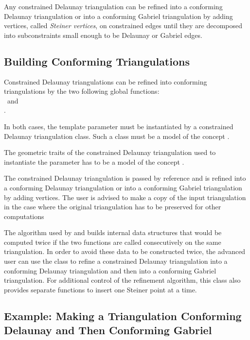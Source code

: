 Any constrained Delaunay triangulation can be refined into a
conforming Delaunay triangulation or into a conforming Gabriel
triangulation by adding vertices, called \emph{Steiner vertices}, on
constrained edges until they are decomposed into subconstraints small enough
to be Delaunay or Gabriel edges.

\subsection{Building Conforming Triangulations\label{sec:Mesh_2_building_conforming}}

Constrained Delaunay triangulations can be refined into
conforming triangulations 
by the two following global functions: \\
~and\\
. 

In both cases, the template parameter  must be instantiated
by a constrained Delaunay triangulation class.  Such a class must be a
model of the concept .

The geometric traits of the constrained
Delaunay triangulation used to instantiate the parameter  has to
be a model of the concept .

The constrained Delaunay triangulation  is passed by reference
and is refined into a conforming Delaunay triangulation or into a
conforming Gabriel triangulation by adding vertices. The user is advised to
make a copy of the input triangulation in the case where the original
triangulation has to be preserved for other computations

The algorithm used by  and
 builds internal data structures that would be
computed twice if the two functions are called consecutively on the same
triangulation. In order to avoid these data to be constructed twice, the
advanced user can use the class  to
refine a constrained Delaunay triangulation into a conforming Delaunay
triangulation and then into a conforming Gabriel triangulation. For
additional control of the refinement algorithm, this class also provides
separate functions to insert one Steiner point at a time.

\subsection{Example: Making a Triangulation Conforming Delaunay and Then
  Conforming Gabriel\label{sec:Mesh_2_example_making_conforming}}


